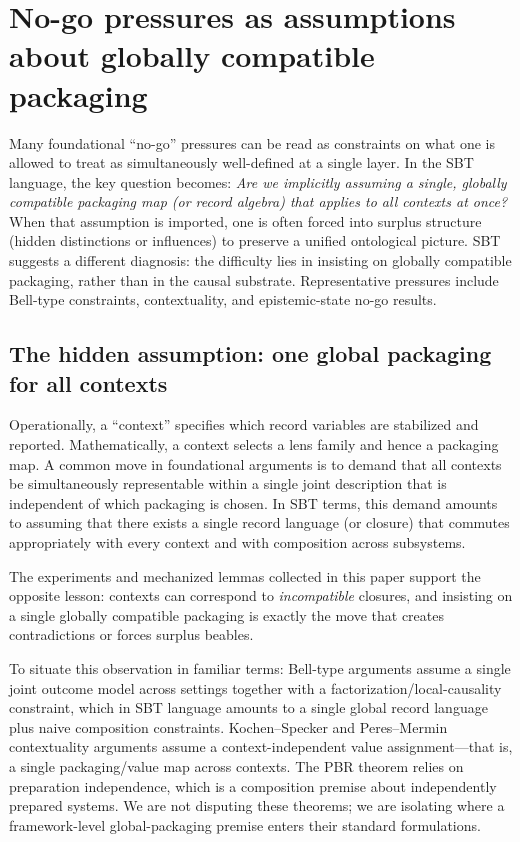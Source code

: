 \section{No-go pressures as assumptions about globally compatible packaging}\label{sec:no-go}

Many foundational ``no-go'' pressures can be read as constraints on what one is allowed to treat as simultaneously well-defined at a single layer.
In the SBT language, the key question becomes:
\emph{Are we implicitly assuming a single, globally compatible packaging map (or record algebra) that applies to all contexts at once?}
When that assumption is imported, one is often forced into surplus structure (hidden distinctions or influences) to preserve a unified ontological picture.
SBT suggests a different diagnosis: the difficulty lies in insisting on globally compatible packaging, rather than in the causal substrate.
Representative pressures include Bell-type constraints, contextuality, and epistemic-state no-go results.\cite{Bell1964,KochenSpecker1967,Mermin1990,Pusey2012PBR}

\subsection{The hidden assumption: one global packaging for all contexts}

Operationally, a ``context'' specifies which record variables are stabilized and reported.
Mathematically, a context selects a lens family and hence a packaging map.
A common move in foundational arguments is to demand that all contexts be simultaneously representable within a single joint description that is independent of which packaging is chosen.
In SBT terms, this demand amounts to assuming that there exists a single record language (or closure) that commutes appropriately with every context and with composition across subsystems.

The experiments and mechanized lemmas collected in this paper support the opposite lesson:
contexts can correspond to \emph{incompatible} closures, and insisting on a single globally compatible packaging is exactly the move that creates contradictions or forces surplus beables.

To situate this observation in familiar terms: Bell-type arguments assume a single joint outcome model across settings together with a factorization/local-causality constraint, which in SBT language amounts to a single global record language plus naive composition constraints. Kochen--Specker and Peres--Mermin contextuality arguments assume a context-independent value assignment---that is, a single packaging/value map across contexts. The PBR theorem relies on preparation independence, which is a composition premise about independently prepared systems. We are not disputing these theorems; we are isolating where a framework-level global-packaging premise enters their standard formulations.

